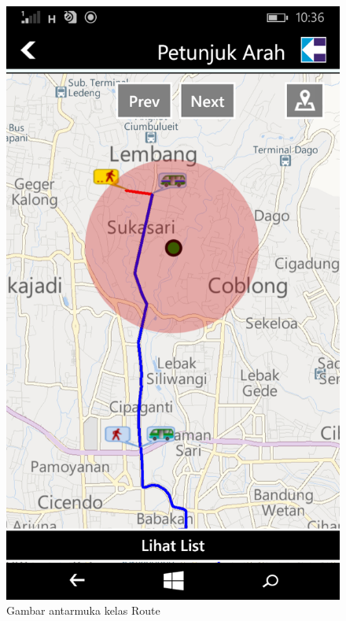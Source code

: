 	\begin{figure}[!h]
		\centering
			\includegraphics[scale=0.2]{Gambar/antarmuka/route_map}
		\caption{Gambar antarmuka kelas Route}
		\label{fig:antarmuka Route}
	\end{figure}
	
